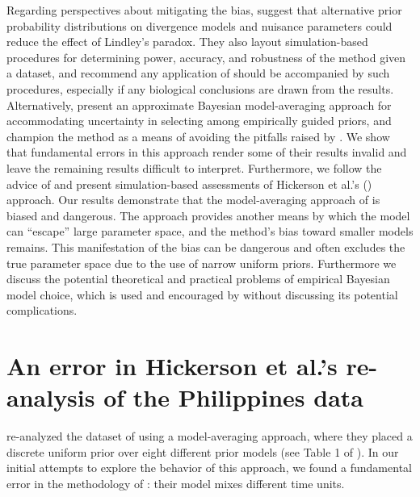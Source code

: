 \documentclass[letterpaper,12pt]{article}
\begin{document}
\begin{linenumbers}

Regarding perspectives about mitigating the bias, \citet{Oaks2012} suggest that
alternative prior probability distributions on divergence models and nuisance
parameters could reduce the effect of Lindley's paradox.
They also layout simulation-based procedures for determining power, accuracy,
and robustness of the method given a dataset, and recommend any application of
\msb should be accompanied by such procedures, especially if any biological
conclusions are drawn from the results.
Alternatively, \citet{Hickerson2013} present an approximate Bayesian
model-averaging approach for accommodating uncertainty in selecting among
empirically guided priors, and champion the method as a means of avoiding the
pitfalls raised by \citet{Oaks2012}.
We show that fundamental errors in this approach render some of their results
invalid and leave the remaining results difficult to interpret.
Furthermore, we follow the advice of \citet{Oaks2012} and present
simulation-based assessments of Hickerson et al.'s (\citeyear{Hickerson2013})
approach.
Our results demonstrate that the model-averaging approach of
\citet{Hickerson2013} is biased and dangerous.
The approach provides another means by which the model can ``escape'' large
parameter space, and the method's bias toward smaller models remains.
This manifestation of the bias can be dangerous and often excludes the true
parameter space due to the use of narrow uniform priors.
Furthermore we discuss the potential theoretical and practical problems of
empirical Bayesian model choice, which is used and encouraged by
\citet{Hickerson2013} without discussing its potential complications.


\section*{An error in Hickerson et al.'s re-analysis of the Philippines data}
\citet{Hickerson2013} re-analyzed the dataset of \citet{Oaks2012} using a
model-averaging approach, where they placed a discrete uniform prior over eight
different prior models (see Table 1 of \citet{Hickerson2013}).
In our initial attempts to explore the behavior of this approach, we found
a fundamental error in the methodology of \citet{Hickerson2013}:
their model mixes different time units.


\end{linenumbers}
\end{document}
